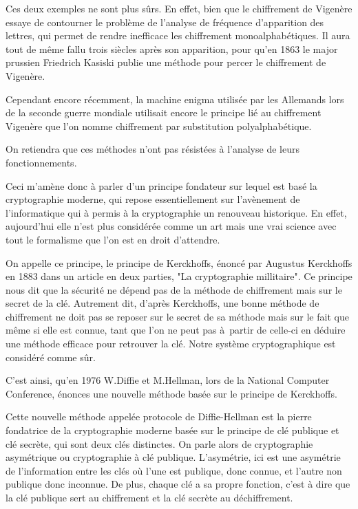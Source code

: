 Ces deux exemples ne sont plus sûrs. En effet, bien que le chiffrement de Vigenère essaye de
contourner le problème de l'analyse de fréquence d'apparition des lettres, qui permet de rendre
inefficace les chiffrement monoalphabétiques. Il aura tout de
même fallu trois
siècles après son apparition, pour qu'en 1863 le major prussien Friedrich Kasiski publie une
méthode pour percer le chiffrement de Vigenère.

Cependant encore récemment, la machine enigma utilisée par les Allemands lors de la seconde
guerre mondiale utilisait encore le principe lié au chiffrement Vigenère que l'on nomme chiffrement
par substitution polyalphabétique.

On retiendra que ces méthodes n'ont pas résistées à l'analyse de leurs
fonctionnements.

Ceci m'amène donc à parler d'un principe fondateur sur lequel est basé la cryptographie
moderne, qui repose essentiellement sur l'avènement de l'informatique qui à permis à la
cryptographie un renouveau historique. En effet, aujourd'hui elle n'est plus considérée comme
un art mais une vrai science avec tout le formalisme que l'on est en droit d'attendre.

On appelle ce principe, le principe de Kerckhoffs, énoncé par Augustus Kerckhoffs en 1883 dans
un article en deux parties, "La cryptographie millitaire". Ce principe nous dit que la sécurité
ne dépend pas de la méthode de chiffrement mais sur le secret de la clé. Autrement dit, d'après
Kerckhoffs, une bonne méthode de chiffrement ne doit pas se reposer sur le secret de sa
méthode mais sur le fait que même si elle est connue, tant que l'on ne peut pas à partir de
celle-ci en déduire une méthode efficace pour retrouver la clé. Notre système
cryptographique est considéré comme sûr. 

C'est ainsi, qu'en 1976 W.Diffie et M.Hellman, lors de la National Computer Conference,
énonces une nouvelle méthode basée sur le principe de Kerckhoffs. 

Cette nouvelle méthode appelée protocole de Diffie-Hellman est la pierre fondatrice de la
cryptographie moderne basée sur le
principe de clé publique et clé secrète, qui sont deux clés distinctes. On parle alors de cryptographie asymétrique ou
cryptographie à clé publique.
L'asymétrie, ici est une asymétrie de l'information entre les clés où l'une est publique, donc
connue, et l'autre non publique donc inconnue. De plus, chaque clé a sa propre fonction,
c'est à dire que la clé publique sert au chiffrement et la clé secrète au déchiffrement.

